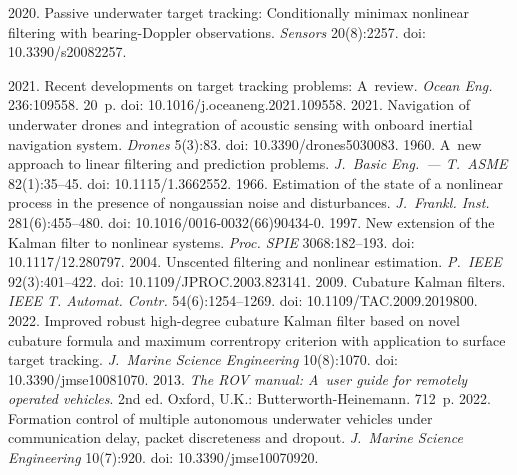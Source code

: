 \begin{multicols}{2}
{{\begin{thebibliography}{99}
       2020. Passive underwater target 
tracking: Conditionally minimax nonlinear filtering with bearing-Doppler observations. \textit{Sensors} 
20(8):2257. doi: 10.3390/s20082257.

       2021. Recent developments on target tracking problems: 
A~review. \textit{Ocean Eng.} 236:109558. 20~p. doi: 10.1016/j.oceaneng.2021.109558.
       2021. Navigation of underwater drones and 
integration of acoustic sensing with onboard inertial navigation system. \textit{Drones} 5(3):83. doi: 
10.3390/drones5030083.
       1960. A~new approach to linear filtering and prediction problems. 
\textit{J.~Basic Eng.~--- T.~ASME} 82(1):35--45. doi: 10.1115/1.3662552.
       1966. Estimation of the state of a nonlinear process in the 
presence of nongaussian noise and disturbances. \textit{J.~Frankl. Inst.} 281(6):455--480. doi: 
10.1016/0016-0032(66)90434-0.
       1997. New extension of the Kalman filter to nonlinear 
systems. \textit{Proc. SPIE}  
3068:182--193. doi: 10.1117/12.280797.
       2004. Unscented filtering and nonlinear estimation. 
\textit{P.~IEEE} 92(3):401--422. doi: 10.1109/JPROC.2003.823141.
       2009. Cubature Kalman filters. \textit{IEEE T. Automat. 
Contr.} 54(6):1254--1269. doi: 10.1109/TAC.2009.2019800.
       2022. Improved robust high-degree cubature Kalman 
filter based on novel cubature formula and maximum correntropy criterion with application to surface 
target tracking. \textit{J.~Marine Science Engineering} 10(8):1070. doi: 10.3390/jmse10081070.
       2013. \textit{The ROV manual: A~user guide for 
remotely operated vehicles}. 2nd ed. Oxford, U.K.: Butterworth-Heinemann. 712~p.
       2022. Formation control of 
multiple autonomous underwater vehicles under communication delay, packet discreteness and dropout. 
\textit{J.~Marine Science Engineering} 10(7):920. doi: 10.3390/jmse10070920.

\end{thebibliography}}}
\end{multicols}
